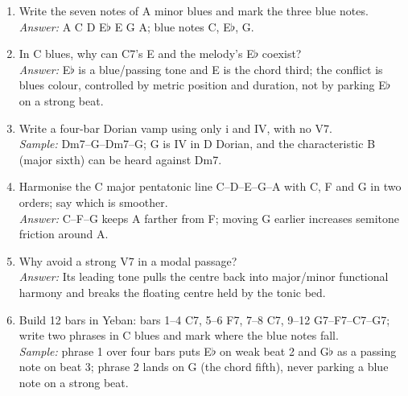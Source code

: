 \begin{exercise}
\begin{enumerate}
  \item Write the seven notes of A minor blues and mark the three blue notes.\\
  \emph{Answer:} A C D E\(\flat\) E G A; blue notes C, E\(\flat\), G.
  \item In C blues, why can C7's E and the melody's E\(\flat\) coexist?\\
  \emph{Answer:} E\(\flat\) is a blue/passing tone and E is the chord third; the conflict is blues colour, controlled by metric position and duration, not by parking E\(\flat\) on a strong beat.
  \item Write a four-bar Dorian vamp using only i and IV, with no V7.\\
  \emph{Sample:} Dm7--G--Dm7--G; G is IV in D Dorian, and the characteristic B (major sixth) can be heard against Dm7.
  \item Harmonise the C major pentatonic line C--D--E--G--A with C, F and G in two orders; say which is smoother.\\
  \emph{Answer:} C--F--G keeps A farther from F; moving G earlier increases semitone friction around A.
  \item Why avoid a strong V7 in a modal passage?\\
  \emph{Answer:} Its leading tone pulls the centre back into major/minor functional harmony and breaks the floating centre held by the tonic bed.
  \item Build 12 bars in Yeban: bars 1--4 C7, 5--6 F7, 7--8 C7, 9--12 G7--F7--C7--G7; write two phrases in C blues and mark where the blue notes fall.\\
  \emph{Sample:} phrase 1 over four bars puts E\(\flat\) on weak beat 2 and G\(\flat\) as a passing note on beat 3; phrase 2 lands on G (the chord fifth), never parking a blue note on a strong beat.
\end{enumerate}
\end{exercise}

